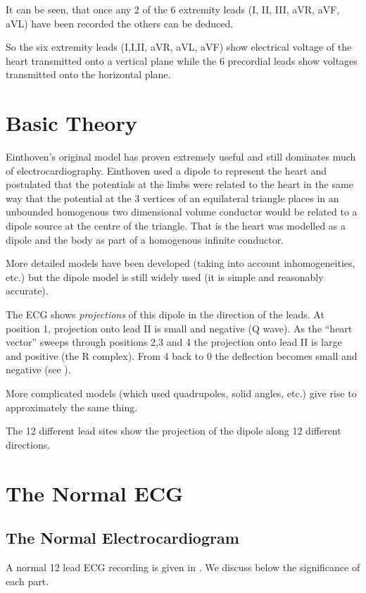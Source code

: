 It can be seen, that once any 2 of the 6 extremity leads (I, II, III, aVR,
aVF, aVL) have been recorded the others can be deduced.

So the six extremity leads (I,I,II, aVR, aVL, aVF) show electrical voltage of
the heart transmitted onto a vertical plane while the 6 precordial leads show
voltages transmitted onto the horizontal plane.

\section{Basic Theory}

Einthoven's original model has proven extremely useful and still dominates
much of electrocardiography. Einthoven used a dipole to represent the heart
and postulated that the potentials at the limbs were related to the heart in
the same way that the potential at the 3 vertices of an equilateral triangle
places in an unbounded homogenous two dimensional volume conductor would be
related to a dipole source at the centre of the triangle. That is the heart
was modelled as a dipole and the body as part of a homogenous infinite
conductor.

More detailed models have been developed (taking into account inhomogeneities,
etc.) but the dipole model is still widely used (it is simple and reasonably
accurate).

The ECG shows \emph{projections} of this dipole in the direction of the leads.
At position 1, projection onto lead II is small and negative (Q wave). As the
``heart vector'' sweeps through positions 2,3 and 4 the projection onto lead
II is large and positive (the R complex). From 4 back to 0 the deflection
becomes small and negative (see ).


More complicated models (which used quadrupoles, solid angles, etc.) give rise
to approximately the same thing.

The 12 different lead sites show the projection of the dipole along 12
different directions.


\section{The Normal ECG} 

\subsection{The Normal Electrocardiogram}
A normal 12 lead ECG recording is given in .  We discuss
below the significance of each part.
